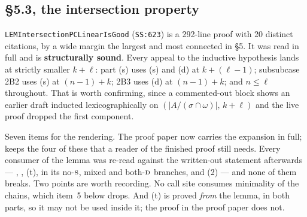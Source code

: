 \subsection{\S5.3, the intersection property}\label{sec:exp-53}

\texttt{LEMIntersectionPCLinearIsGood} (\texttt{SS:623}) is a 292-line proof
with 20 distinct citations, by a wide margin the largest and most connected in
\S5. It was read in full and is \textbf{structurally sound}. Every appeal to
the inductive hypothesis lands at strictly smaller $k+\ell$: part (s) uses (s)
and (d) at $k+(\ell-1)$; subsubcase 2B2 uses (s) at $(n-1)+k$; 2B3 uses (d) at
$(n-1)+k$; and $n\le\ell$ throughout. That is worth confirming, since a
commented-out block shows an earlier draft inducted lexicographically on
$(|A/(\sigma\cap\omega)|,\,k+\ell)$ and the live proof dropped the first
component.

Seven items for the rendering. The proof paper now carries the expansion in
full;  keeps the four of these that a reader of
the finished proof still needs. Every consumer of the lemma was re-read against
the written-out statement afterwards --- ,
, (t),
 in its no-$\textup{\textsc{s}}$, mixed and both-$\textup{\textsc{d}}$ branches,
and (2) --- and none of them breaks. Two points are worth
recording. No call site consumes minimality of the chains, which item~5 below
drops. And (t) is proved \emph{from} the lemma, in both
parts, so it may not be used inside it; the proof in the proof paper does not.

